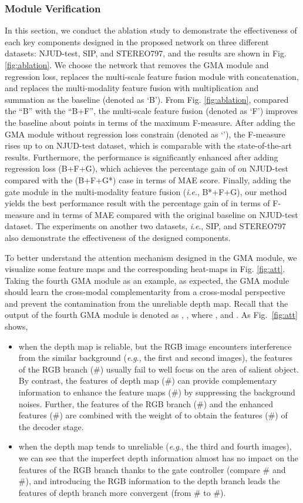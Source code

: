 \documentclass[journal]{IEEEtran}
\newcommand{\ie}{\textit{i}.\textit{e}.}
\newcommand{\eg}{\textit{e}.\textit{g}.}
\begin{document}
\subsubsection{\textbf{Module Verification}} In this section, we conduct the ablation study to demonstrate the effectiveness of each key components designed in the proposed network on three different datasets: NJUD-test, SIP, and STEREO797, and the results are shown in Fig. \ref{fig:ablation}. We choose the network that removes the GMA module and regression loss, replaces the multi-scale feature fusion module with concatenation, and replaces the multi-modality feature fusion with multiplication and summation as the baseline (denoted as `B'). From Fig. \ref{fig:ablation}, compared the ``B'' with the ``B+F'', the multi-scale feature fusion (denoted as `F') improves the baseline about  points in terms of the maximum F-measure. After adding the GMA module without regression loss constrain (denoted as `'), the F-measure rises up to  on NJUD-test dataset, which is comparable with the state-of-the-art results. Furthermore, the performance is significantly enhanced after adding regression loss (B+F+G), which achieves the percentage gain of  on NJUD-test compared with the (B+F+G*) case in terms of MAE score. Finally, adding the gate module in the multi-modality feature fusion (\ie, B*+F+G), our method yields the best performance result with the percentage gain of  in terms of F-measure and  in terms of MAE compared with the original baseline on NJUD-test dataset. The experiments on another two datasets, \ie, SIP, and STEREO797 also demonstrate the effectiveness of the designed components.

To better understand the attention mechanism designed in the GMA module, we visualize some feature maps and the corresponding heat-maps in Fig. \ref{fig:att}.
Taking the fourth GMA module as an example, as expected, the GMA module should learn the cross-modal complementarity from a cross-modal perspective and prevent the contamination from the unreliable depth map. Recall that the output of the fourth GMA module is denoted as , , where , and . As Fig.\ \ref{fig:att} shows,
\begin{itemize}
	\item when the depth map is reliable, but the RGB image encounters interference from the similar background (\eg, the first and second images), the features of the RGB branch (\#) usually fail to well focus on the area of salient object. By contrast, the features of depth map (\#) can provide complementary information to enhance the feature maps (\#) by suppressing the background noises. Further, the features of the RGB branch (\#) and the enhanced features (\#) are combined with the weight of  to obtain the features (\#) of the decoder stage.
	
\item  when the depth map tends to unreliable (\eg, the third and fourth images), we can see that the imperfect depth information almost has no impact on the features of the RGB branch thanks to the gate controller  (compare \# and \#), and introducing the RGB information to the depth branch leads the features of depth branch more convergent (from \# to \#).
\end{itemize}
\end{document}
